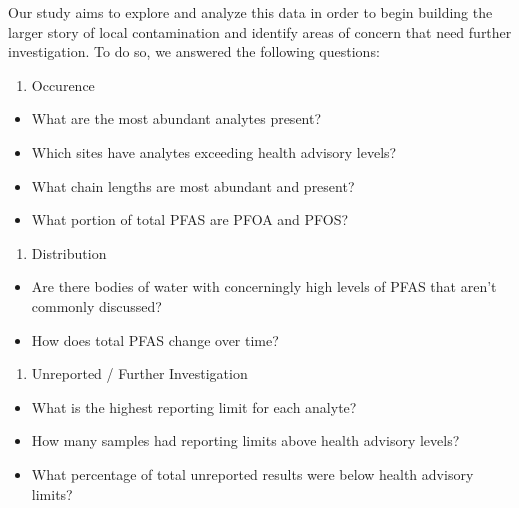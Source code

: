 \documentclass[
  12pt,
]{article}
\providecommand{\tightlist}{%
  \setlength{\itemsep}{0pt}\setlength{\parskip}{0pt}}
\begin{document}
Our study aims to explore and analyze this data in order to begin
building the larger story of local contamination and identify areas of
concern that need further investigation. To do so, we answered the
following questions:

\begin{enumerate}
\def\labelenumi{\arabic{enumi}.}
\tightlist
\item
  Occurence
\end{enumerate}

\begin{itemize}
\tightlist
\item
  What are the most abundant analytes present?
\item
  Which sites have analytes exceeding health advisory levels?
\item
  What chain lengths are most abundant and present?
\item
  What portion of total PFAS are PFOA and PFOS?
\end{itemize}

\begin{enumerate}
\def\labelenumi{\arabic{enumi}.}
\setcounter{enumi}{1}
\tightlist
\item
  Distribution
\end{enumerate}

\begin{itemize}
\tightlist
\item
  Are there bodies of water with concerningly high levels of PFAS that
  aren't commonly discussed?
\item
  How does total PFAS change over time?
\end{itemize}

\begin{enumerate}
\def\labelenumi{\arabic{enumi}.}
\setcounter{enumi}{2}
\tightlist
\item
  Unreported / Further Investigation
\end{enumerate}

\begin{itemize}
\tightlist
\item
  What is the highest reporting limit for each analyte?
\item
  How many samples had reporting limits above health advisory levels?
\item
  What percentage of total unreported results were below health advisory
  limits?
\end{itemize}

\newpage
\end{document}
